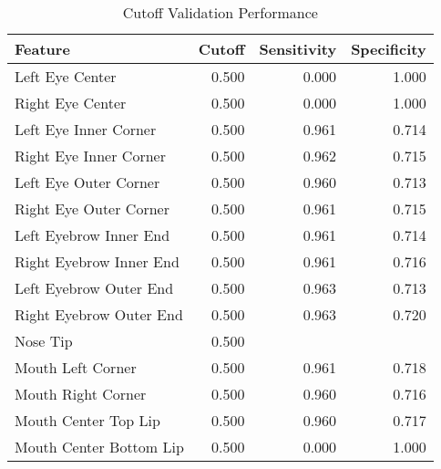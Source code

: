 \begin{table}[ht]
\centering
\caption{Cutoff Validation Performance} 
\label{tab:logistic_cutoff_table}
\begin{tabular}{lrrr}
  \hline
Feature & Cutoff & Sensitivity & Specificity \\ 
  \hline
Left Eye Center & 0.500 & 0.000 & 1.000 \\ 
  Right Eye Center & 0.500 & 0.000 & 1.000 \\ 
  Left Eye Inner Corner & 0.500 & 0.961 & 0.714 \\ 
  Right Eye Inner Corner & 0.500 & 0.962 & 0.715 \\ 
  Left Eye Outer Corner & 0.500 & 0.960 & 0.713 \\ 
  Right Eye Outer Corner & 0.500 & 0.961 & 0.715 \\ 
  Left Eyebrow Inner End & 0.500 & 0.961 & 0.714 \\ 
  Right Eyebrow Inner End & 0.500 & 0.961 & 0.716 \\ 
  Left Eyebrow Outer End & 0.500 & 0.963 & 0.713 \\ 
  Right Eyebrow Outer End & 0.500 & 0.963 & 0.720 \\ 
  Nose Tip & 0.500 &  &  \\ 
  Mouth Left Corner & 0.500 & 0.961 & 0.718 \\ 
  Mouth Right Corner & 0.500 & 0.960 & 0.716 \\ 
  Mouth Center Top Lip & 0.500 & 0.960 & 0.717 \\ 
  Mouth Center Bottom Lip & 0.500 & 0.000 & 1.000 \\ 
   \hline
\end{tabular}
\end{table}
